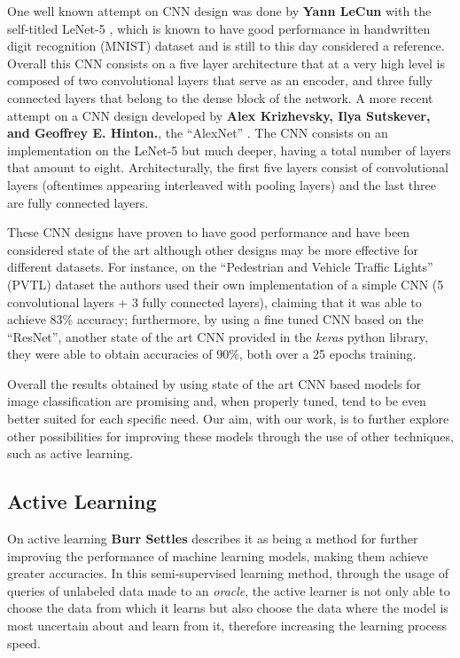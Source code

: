 \documentclass[journal, a4paper]{IEEEtran}
\begin{document}
One well known attempt on CNN design was done by \textbf{Yann LeCun} with
the self-titled LeNet-5 \cite{LeNet-5}, which is known to have good performance in handwritten
digit recognition (MNIST) dataset and is still to this day considered a reference.
Overall this CNN consists on a five layer architecture that at a very high level 
is composed of two convolutional layers that serve as an encoder, and three 
fully connected layers that belong to the dense block of the network. 
A more recent attempt on a CNN design developed by \textbf{Alex Krizhevsky, Ilya Sutskever, 
and Geoffrey E. Hinton.}, the ``AlexNet'' \cite{AlexNet}. The CNN consists on an implementation 
on the LeNet-5 \cite{LeNet-5} but much deeper, having a total number of layers that amount to 
eight. Architecturally, the first five layers consist of convolutional layers (oftentimes 
appearing interleaved with pooling layers) and the last three are fully connected layers.

These CNN designs have proven to have good performance and have been considered state of the art
although other designs may be more effective for different datasets. For instance, on the
``Pedestrian and Vehicle Traffic Lights'' (PVTL) dataset \cite{PVTL} the authors used their own
implementation of a simple CNN (5 convolutional layers + 3 fully connected layers), claiming that 
it was able to achieve 83\% accuracy; furthermore, by using  a fine tuned CNN based on the 
``ResNet'', another state of the art CNN provided in the \textit{keras} python library, they 
were able to obtain accuracies of 90\%, both over a 25 epochs training.

Overall the results obtained by using state of the art CNN based models for image 
classification are promising and, when properly tuned, tend to be even better suited for 
each specific need. Our aim, with our work, is to further explore other possibilities for 
improving these models through the use of other techniques, such as active learning.

\subsection{Active Learning}

On active learning \textbf{Burr Settles} \cite{settles.tr09, pmlr-v16-settles11a} describes
it as being a method for further improving the performance of machine learning models, making
them achieve greater accuracies. In this semi-supervised learning method, through the usage of 
queries of unlabeled data made to an \textit{oracle}, the active learner is not only able to 
choose the data from which it learns but also choose the data where the model is most 
uncertain about and learn from it, therefore increasing the learning process speed.
\end{document}
